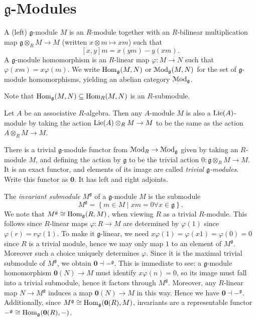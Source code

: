\section{$\mathfrak{g}$-Modules}

\begin{definition}\label{7.2.1}
	A (left) $\mathfrak{g} $-module $M$ is an $R$-module together with an $R$-bilinear multiplication map $\mathfrak{g} \otimes _RM \to M$ (written $x\otimes m\mapsto xm$) such that
	\[
		[x,y]m=x(ym)-y(xm)
	.\]
	A $\mathfrak{g} $-module homomorphism is an $R$-linear map $\varphi : M \to N$ such that $\varphi (xm)=x\varphi (m)$. We write $\operatorname{Hom}_\mathfrak{g} (M,N)$ or $\mathcal{M}\mathrm{od} _\mathfrak{g} (M,N)$ for the set of $\mathfrak{g} $-module homomorphisms, yielding an abelian category $\mathcal{M}\mathrm{od} _\mathfrak{g} $.
\end{definition}

\begin{remark}\label{7.2.2}
Note that $\operatorname{Hom}_\mathfrak{g} (M,N)\subseteq \operatorname{Hom}_R(M,N)$ is an $R$-submodule.
\end{remark}

\begin{example}\label{7.2.3}
	Let $A$ be an associative $R$-algebra. Then any $A$-module $M$ is also a $\mathrm{Lie}(A)$-module by taking the action $\mathrm{Lie}(A)\otimes_RM \to M$ to be the same as the action $A\otimes _RM \to M$.
\end{example}


\begin{example}\label{7.2.4}
There is a trivial $\mathfrak{g} $-module functor from $\mathcal{M}\mathrm{od} _R\to \mathcal{M}\mathrm{od} _\mathfrak{g} $ given by taking an $R$-module $M$, and defining the action by $\mathfrak{g} $ to be the trivial action $0: \mathfrak{g} \otimes _RM \to M$. It is an exact functor, and elements of its image are called \emph{trivial $\mathfrak{g} $-modules}. Write this functor as $\mathbf{0} $. It has left and right adjoints.
\end{example}

The \emph{invariant submodule} $M^\mathfrak{g} $ of a $\mathfrak{g} $-module $M$ is the submodule
\[
	M^\mathfrak{g} =\left\{ m\in M\mid xm=0\forall x\in \mathfrak{g}  \right\} 
.\]
We note that $M^\mathfrak{g} \cong \operatorname{Hom}_\mathfrak{g} (R,M)$, when viewing $R$ as a trivial $R$-module. This follows since $R$-linear maps $\varphi :R\to M$ are determined by $\varphi (1)$ since $\varphi (r)=r\varphi (1)$. To make it $\mathfrak{g} $-linear, we need $x\varphi (1)=\varphi (x1)=\varphi (0)=0$ since $R$ is a trivial module, hence we may only map $1$ to an element of $M^\mathfrak{g} $. Moreover such a choice uniquely determines $\varphi $. Since it is the maximal trivial submodule of $M^\mathfrak{g} $, we obtain $\mathbf{0} \dashv -^{\mathfrak{g} } $. This is immediate to see: a $\mathfrak{g} $-module homomorphism $\mathbf{0} (N)\to M$ must identify $x\varphi (n)=0$, so its image must fall into a trivial submodule, hence it factors through $M^\mathfrak{g} $. Moreover, any $R$-linear map $N\to M^\mathfrak{g}$ induces a map $\mathbf{0} (N)\to M$ in this way. Hence we have $\mathbf{0} \dashv -^\mathfrak{g} $. Additionally, since $M^\mathfrak{g} \cong \operatorname{Hom}_\mathfrak{g} (\mathbf{0} (R),M)$, invariants are a representable functor $-^\mathfrak{g} \cong \operatorname{Hom}_\mathfrak{g} (\mathbf{0} (R),-)$.



